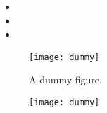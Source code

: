 \documentclass[]{ntuexam}
\begin{document}
\begin{questions}


\question \lipsum[1][1]



\question[25] \lipsum[1][1-3]

\begin{itemize}
  \item \lipsum[2][1]
  \item \lipsum[2][2]
  \item \lipsum[2][3]
\end{itemize}

\lipsum[1][4-6]
\droppoints

\begin{figure}[ht]
%
  \centering
  \texttt{[image: dummy]}
  \caption{A dummy figure.}\label{fig:test}
\end{figure}

\begin{figure}[ht]
  \centering
  \texttt{[image: dummy]}
  \caption{}
\end{figure}


\end{questions}
\end{document}
